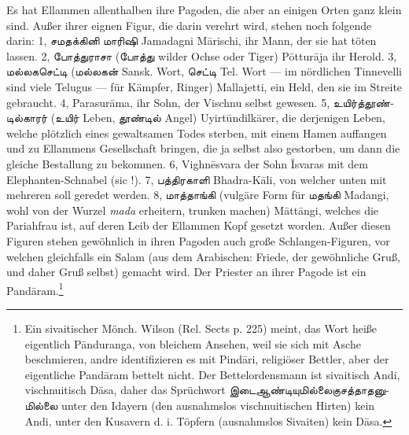 \documentclass{article}
\newcommand{\TamilText}[1]{\texttamil{#1}}
\newcommand{\tam}[1]{\TamilText{#1}}
\begin{document}
Es hat Ellammen allenthalben ihre Pagoden, die aber an einigen Orten ganz klein sind. Außer ihrer eignen Figur, die darin verehrt wird, stehen noch folgende darin: 1, \tam{சமதக்கினி} \tam{மாரிஷி} Jamadagni M\={a}rischi, ihr Mann, der sie hat töten lassen. 2, \tam{போத்துராசா} (\tam{போத்து} wilder Ochse oder Tiger) P\={o}ttur\={a}ja ihr Herold. 3, \tam{மல்லகசெட்டி} (\tam{மல்லகன்} Sansk. Wort, \tam{செட்டி} Tel. Wort — im nördlichen Tinnevelli sind viele Telugus — für Kämpfer, Ringer) Mallajetti, ein Held, den sie im Streite gebraucht. 4, Parasur\={a}ma, ihr Sohn, der Vischnu selbst gewesen. 5, \tam{உயிர்த்தூண்டில்காரர்} (\tam{உயிர்} Leben, \tam{தூண்டில்} Angel) Uyirt\={u}ndilk\={a}rer, die derjenigen Leben, welche plötzlich eines gewaltsamen Todes sterben, mit einem Hamen auffangen und zu Ellammens Gesellschaft bringen, die ja selbst also gestorben, um dann die gleiche Bestallung zu bekommen. 6, Vighn\={e}svara der Sohn \={I}svaras mit dem Elephanten-Schnabel (sic !). 7, \tam{பத்திரகாளி} Bhadra-K\={a}li, von welcher unten mit mehreren soll geredet werden. 8, \tam{மாத்தாங்கி} (vulgäre Form für \tam{மதங்கி} Madangi, wohl von der Wurzel \emph{mada} erheitern, trunken machen) M\={a}tt\={a}ngi, welches die Pariahfrau ist, auf deren Leib der Ellammen Kopf gesetzt worden. Außer diesen Figuren stehen gewöhnlich in ihren Pagoden auch große Schlangen-Figuren, vor welchen gleichfalls ein Salam (aus dem Arabischen: Friede, der gewöhnliche Gruß, und daher Gruß selbst) gemacht wird. Der Priester an ihrer Pagode ist ein Pand\={a}ram.\footnote{Ein sivaitischer Mönch. Wilson (Rel. Sects p. 225) meint, das Wort heiße eigentlich P\={a}nduranga, von bleichem Ansehen, weil sie sich mit Asche beschmieren, andre identifizieren es mit Pind\={a}ri, religiöser Bettler, aber der eigentliche Pand\={a}ram bettelt nicht. Der Bettelordensmann ist sivaitisch Andi, vischnuitisch D\={a}sa, daher das Sprüchwort \tam{இடைஆண்டியுமில்லைகுசத்தாதனுமில்லை} unter den Idayern (den ausnahmslos vischnuitischen Hirten) kein Andi, unter den Kusavern d. i. Töpfern (ausnahmslos Sivaiten) kein D\={a}sa.}
\end{document}
